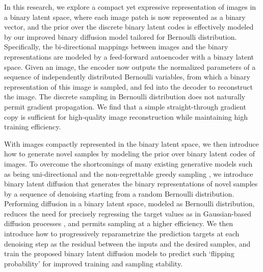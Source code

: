 \documentclass[10pt,twocolumn,letterpaper]{article}
\begin{document}
In this research, we explore a compact yet expressive representation of images in a binary latent space, where each image patch is now represented as a binary vector, and the prior over the discrete binary latent codes is effectively modeled by our improved binary diffusion model tailored for Bernoulli distribution. 
Specifically, the bi-directional mappings between images and the binary representations are modeled by a feed-forward autoencoder with a binary latent space. 
Given an image, the encoder now outputs the normalized parameters of a sequence of independently distributed Bernoulli variables, from which a binary representation of this image is sampled, and fed into the decoder to reconstruct the image. 
The discrete sampling in Bernoulli distribution does not naturally permit gradient propagation. We find that a simple straight-through gradient copy \cite{estimating,latentb} is sufficient for high-quality image reconstruction while maintaining high training efficiency. 

With images compactly represented in the binary latent space, we then introduce how to generate novel samples by modeling the prior over binary latent codes of images. 
To overcome the shortcomings of many existing generative models such as being uni-directional \cite{vqvae,vqvae2} and the non-regrettable greedy sampling \cite{maskgit,unleashing}, we introduce binary latent diffusion that generates the binary representations of novel samples by a sequence of denoising starting from a random Bernoulli distribution. 
Performing diffusion in a binary latent space, modeled as Bernoulli distribution, reduces the need for precisely regressing the target values as in Gaussian-based diffusion processes \cite{ddpm,ddim,latent}, and permits sampling at a higher efficiency.
We then introduce how to progressively reparametrize the prediction targets at each denoising step as the residual between the inputs and the desired samples, and train the proposed binary latent diffusion models to predict such `flipping probability' for improved training and sampling stability. 

\end{document}
